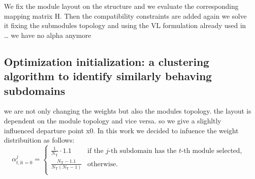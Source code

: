 We fix the module layout on the structure and we evaluate the corresponding mapping matrix H. Then the compatibility constraints are added again
we solve it fixing the submodules topology and using the VL formulation already used in \dots
we have no alpha anymore
\subsection{Optimization initialization: a clustering algorithm to identify similarly behaving subdomains}
we are not only changing the weights but also the modules topology.  the layout is dependent on the module topology and vice versa. so we give a slighltly influenced departure point x0. In this work we decided to infuence the weight distribuition as follows:
\begin{equation}
    \alpha_{t,\text{it}=0}^j=
    \begin{cases}
        \frac{1}{N_\text{T}} \cdot 1.1  & \text{if the $j$-th subdomain has the  $t$-th module selected,}\\
        \frac{N_\text{T}-1.1}{N_\text{T}(N_\text{T}-1)} & \text{otherwise.} \\
    \end{cases}  
\end{equation}

